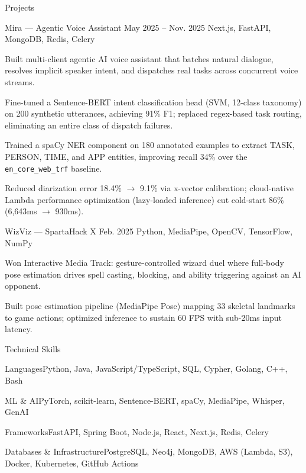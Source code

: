 \documentclass[
	11pt
]{../../../resume}
\begin{document}
	\begin{rSection}{P}{rojects}
		\begin{rSectionEntry}
			{Mira --- Agentic Voice Assistant}
			{May 2025 -- Nov. 2025}
			{}
			{Next.js, FastAPI, MongoDB, Redis, Celery}
			{}

			\item Built multi-client agentic AI voice assistant that batches natural dialogue, resolves implicit speaker intent, and dispatches real tasks across concurrent voice streams.
			\item Fine-tuned a Sentence-BERT intent classification head (SVM, 12-class taxonomy) on 200 synthetic utterances, achieving 91\% F1; replaced regex-based task routing, eliminating an entire class of dispatch failures.
			\item Trained a spaCy NER component on 180 annotated examples to extract TASK, PERSON, TIME, and APP entities, improving recall 34\% over the \texttt{en\_core\_web\_trf} baseline.
			\item Reduced diarization error 18.4\% $\rightarrow$ 9.1\% via x-vector calibration; cloud-native Lambda performance optimization (lazy-loaded inference) cut cold-start 86\% (6{,}643ms $\rightarrow$ 930ms).
		\end{rSectionEntry}

		\begin{rSectionEntry}
			{WizViz --- SpartaHack X}
			{Feb. 2025}
			{}
			{Python, MediaPipe, OpenCV, TensorFlow, NumPy}
			{}

			\item Won Interactive Media Track: gesture-controlled wizard duel where full-body pose estimation drives spell casting, blocking, and ability triggering against an AI opponent.
			\item Built pose estimation pipeline (MediaPipe Pose) mapping 33 skeletal landmarks to game actions; optimized inference to sustain 60 FPS with sub-20ms input latency.
		\end{rSectionEntry}
	\end{rSection}

	\begin{rSection}{T}{echnical Skills}
		\begin{rSet}{Languages}{Python, Java, JavaScript/TypeScript, SQL, Cypher, Golang, C++, Bash}
		\end{rSet}
		\begin{rSet}{ML \& AI}{PyTorch, scikit-learn, Sentence-BERT, spaCy, MediaPipe, Whisper, GenAI}
		\end{rSet}
		\begin{rSet}{Frameworks}{FastAPI, Spring Boot, Node.js, React, Next.js, Redis, Celery}
		\end{rSet}
		\begin{rSet}{Databases \& Infrastructure}{PostgreSQL, Neo4j, MongoDB, AWS (Lambda, S3), Docker, Kubernetes, GitHub Actions}
		\end{rSet}
	\end{rSection}
\end{document}
